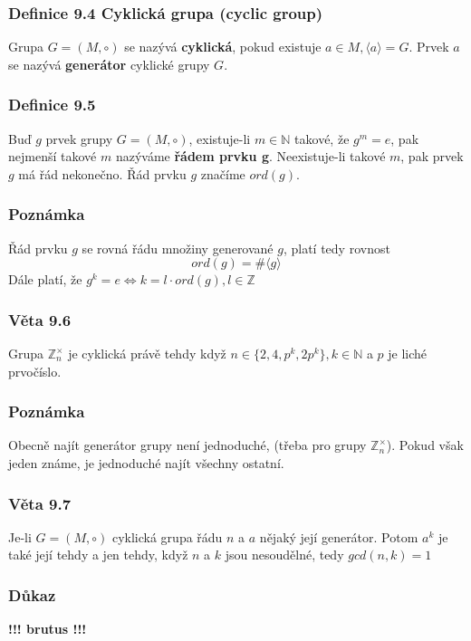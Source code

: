 \documentclass[12pt, letterpaper]{article}
\begin{document}
\subsubsection*{Definice 9.4 Cyklická grupa (cyclic group)}
Grupa $G = (M, \circ)$ se nazývá \textbf{cyklická},
pokud existuje $a \in M, \langle a \rangle = G$. Prvek $a$ se nazývá \textbf{generátor} cyklické grupy $G$.

\subsubsection*{Definice 9.5}
Buď $g$ prvek grupy $G = (M, \circ)$, existuje-li $m \in \mathbb{N}$ takové, že $g^m = e$,
pak nejmenší takové $m$ nazýváme \textbf{řádem prvku g}. Neexistuje-li takové $m$, pak prvek $g$ má řád nekonečno.
Řád prvku $g$ značíme $ord(g)$.

\subsubsection*{Poznámka}
Řád prvku $g$ se rovná řádu množiny generované $g$, platí tedy rovnost
\[ord(g) = \#\langle g \rangle\]
Dále platí, že $ g^k = e \Leftrightarrow k = l \cdot ord(g), l \in \mathbb{Z}$

\subsubsection*{Věta 9.6}
Grupa $\mathbb{Z}^{\times}_{n}$ je cyklická právě tehdy když $n \in \{2, 4, p^k, 2p^k\}, k \in \mathbb{N}$
a $p$ je liché prvočíslo.

\subsubsection*{Poznámka}
Obecně najít generátor grupy není jednoduché, (třeba pro grupy $\mathbb{Z}^{\times}_{n}$).
Pokud však jeden známe, je jednoduché najít všechny ostatní.

\subsubsection*{Věta 9.7}
Je-li $G = (M, \circ)$ cyklická grupa řádu $n$ a $a$ nějaký její generátor.
Potom $a^k$ je také její tehdy a jen tehdy, když $n$ a $k$ jsou nesoudělné, tedy $gcd(n,k) = 1$

\subsubsection*{Důkaz}
\textbf{!!! brutus !!!}
\end{document}
